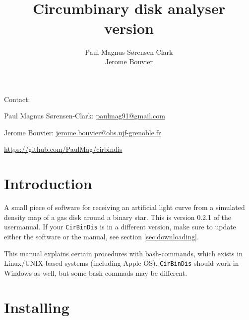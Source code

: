 \documentclass[a4paper, 12pt, english, titlepage]{article}
\title{\sname \\ Circumbinary disk analyser \\ version \sversion}
\author{Paul Magnus Sørensen-Clark \\ Jerome Bouvier}
\newcommand{\sname}{\texttt{CirBinDis}\xspace}
\newcommand{\sversion}{0.2.1\xspace}
\newenvironment{bottompar}[1]{\needspace{#1}\par\vspace*{\fill}}{\clearpage}
\begin{document}
\maketitle
\tableofcontents

\begin{bottompar}{84pt}
Contact:

Paul Magnus Sørensen-Clark:
\href{mailto:paulmag91@gmail.com}{paulmag91@gmail.com}

Jerome Bouvier:
\href{mailto:jerome.bouvier@obs.ujf-grenoble.fr}{jerome.bouvier@obs.ujf-grenoble.fr}

\url{https://github.com/PaulMag/cirbindis}
\end{bottompar}


\section{Introduction}

A small piece of software for receiving an artificial light curve from a simulated density map of a gas disk around a binary star. This is version \sversion of the usermanual. If your \sname is in a different version, make sure to update either the software or the manual, see section \vref{sec:downloading}.

This manual explains certain procedures with bash-commands, which exists in Linux/UNIX-based systems (including Apple OS). \sname should work in Windows as well, but some bash-commads may be different.


\section{Installing}
\end{document}
